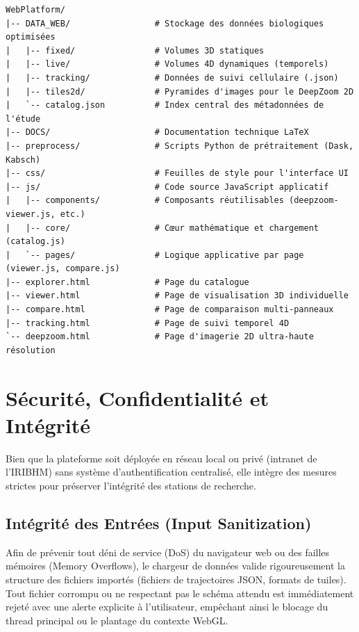 \begin{lstlisting}[caption=Structure générale des dossiers du projet]
WebPlatform/
|-- DATA_WEB/                 # Stockage des données biologiques optimisées
|   |-- fixed/                # Volumes 3D statiques
|   |-- live/                 # Volumes 4D dynamiques (temporels)
|   |-- tracking/             # Données de suivi cellulaire (.json)
|   |-- tiles2d/              # Pyramides d'images pour le DeepZoom 2D
|   `-- catalog.json          # Index central des métadonnées de l'étude
|-- DOCS/                     # Documentation technique LaTeX
|-- preprocess/               # Scripts Python de prétraitement (Dask, Kabsch)
|-- css/                      # Feuilles de style pour l'interface UI
|-- js/                       # Code source JavaScript applicatif
|   |-- components/           # Composants réutilisables (deepzoom-viewer.js, etc.)
|   |-- core/                 # Cœur mathématique et chargement (catalog.js)
|   `-- pages/                # Logique applicative par page (viewer.js, compare.js)
|-- explorer.html             # Page du catalogue
|-- viewer.html               # Page de visualisation 3D individuelle
|-- compare.html              # Page de comparaison multi-panneaux
|-- tracking.html             # Page de suivi temporel 4D
`-- deepzoom.html             # Page d'imagerie 2D ultra-haute résolution
\end{lstlisting}

\section{Sécurité, Confidentialité et Intégrité}

Bien que la plateforme soit déployée en réseau local ou privé (intranet de l'IRIBHM) sans système d'authentification centralisé, elle intègre des mesures strictes pour préserver l'intégrité des stations de recherche.

\subsection{Intégrité des Entrées (Input Sanitization)}
Afin de prévenir tout déni de service (DoS) du navigateur web ou des failles mémoires (Memory Overflows), le chargeur de données valide rigoureusement la structure des fichiers importés (fichiers de trajectoires JSON, formats de tuiles). Tout fichier corrompu ou ne respectant pas le schéma attendu est immédiatement rejeté avec une alerte explicite à l'utilisateur, empêchant ainsi le blocage du thread principal ou le plantage du contexte WebGL.

